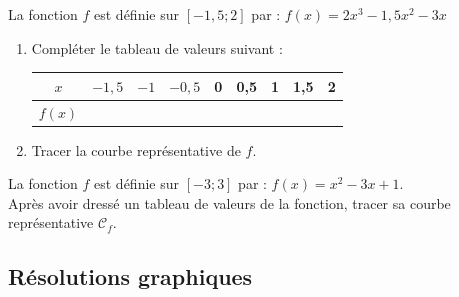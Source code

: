 \begin{exo}
La fonction $f$ est d\'efinie sur $[-1,5;2]$ par : $f(x)=2x^3-1,5x^2-3x$
\begin{enumerate}
	\item Compl\'eter le tableau de valeurs suivant :
	\begin{center}
\begin{tabular}{|*{9}{c|}}
\hline $x$ & $-1,5$ & $-1$ & $-0,5$ & 0 & 0,5 & 1 & 1,5 & 2 \\ \hline
$f(x)$ & & & & & & & & \\ \hline
\end{tabular}
\end{center}
\item Tracer la courbe repr\'esentative de $f$.
\end{enumerate}
\end{exo}

\begin{exo}\label{uneautrecourbe}
La fonction $f$ est d\'efinie sur $[-3;3]$ par : $f(x)=x^2-3x+1$.\\
Apr\`es avoir dress\'e un tableau de valeurs de la fonction, tracer sa courbe repr\'esentative $\mathcal{C}_f$.

\end{exo}




\sautpage

\subsection{R\'esolutions graphiques}

